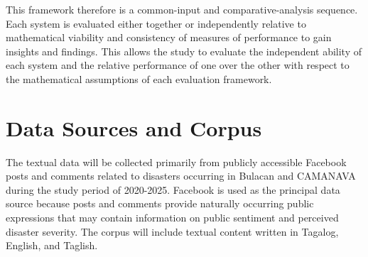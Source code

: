 \documentclass[12pt,a4paper]{report}
\begin{document}
This framework therefore is a common-input and comparative-analysis sequence.
Each system is evaluated either together or independently relative to
mathematical viability and consistency of measures of performance to gain
insights and findings. This allows the study to evaluate the independent ability
of each system and the relative performance of one over the other with respect
to the mathematical assumptions of each evaluation framework.

\section{Data Sources and Corpus}

The textual data will be collected primarily from publicly accessible Facebook
posts and comments related to disasters occurring in Bulacan and CAMANAVA
during the study period of 2020-2025. Facebook is used as the principal data
source because posts and comments provide naturally occurring public
expressions that may contain information on public sentiment and perceived
disaster severity. The corpus will include textual content written in Tagalog,
English, and Taglish.
\end{document}

